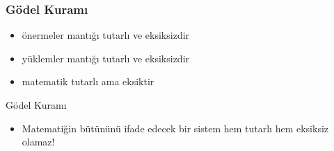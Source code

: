 \documentclass[dvipsnames]{beamer}
\theoremstyle{definition}
\theoremstyle{example}
\newtheorem{ornek}[theorem]{Örnek}
\theoremstyle{plain}
\begin{document}
\begin{frame}
  \frametitle{Gödel Kuramı}

  \begin{itemize}
    \item önermeler mantığı tutarlı ve eksiksizdir
    \item yüklemler mantığı tutarlı ve eksiksizdir

    \pause
    \item matematik tutarlı ama eksiktir
  \end{itemize}

  \pause
  \begin{block}{Gödel Kuramı}
    \begin{itemize}
      \item Matematiğin bütününü ifade edecek bir sistem hem tutarlı hem
        eksiksiz olamaz!
    \end{itemize}
  \end{block}
\end{frame}
%
%
%
%
%
%
%
\end{document}
